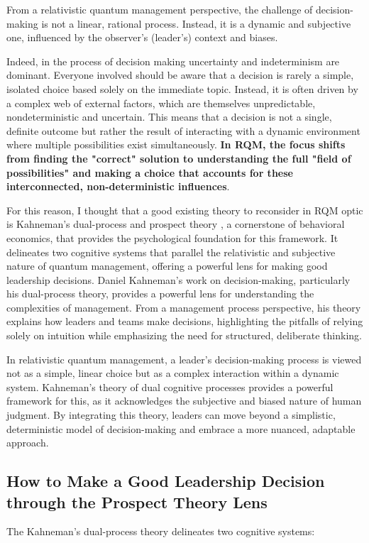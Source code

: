 \documentclass{article}
\begin{document}
From a relativistic quantum management perspective, the challenge of decision-making is not a linear, rational process. Instead, it is a dynamic and subjective one, influenced by the observer's (leader's) context and biases. 

Indeed, in the process of decision making uncertainty and indeterminism are dominant. Everyone involved should be aware that a decision is rarely a simple, isolated choice based solely on the immediate topic. Instead, it is often driven by a complex web of external factors, which are themselves unpredictable, nondeterministic and uncertain. This means that a decision is not a single, definite outcome but rather the result of interacting with a dynamic environment where multiple possibilities exist simultaneously. \textbf{In RQM, the focus shifts from finding the "correct" solution to understanding the full "field of possibilities" and making a choice that accounts for these interconnected, non-deterministic influences}.

For this reason, I thought that a good existing theory to reconsider in RQM optic is Kahneman's dual-process and prospect theory \cite{kahneman2011thinking}, a cornerstone of behavioral economics, that provides the psychological foundation for this framework. It delineates two cognitive systems that parallel the relativistic and subjective nature of quantum management, offering a powerful lens for making good leadership decisions.
Daniel Kahneman's work on decision-making, particularly his dual-process theory, provides a powerful lens for understanding the complexities of management. From a management process perspective, his theory explains how leaders and teams make decisions, highlighting the pitfalls of relying solely on intuition while emphasizing the need for structured, deliberate thinking.

In relativistic quantum management, a leader's decision-making process is viewed not as a simple, linear choice but as a complex interaction within a dynamic system. Kahneman's theory of dual cognitive processes provides a powerful framework for this, as it acknowledges the subjective and biased nature of human judgment. By integrating this theory, leaders can move beyond a simplistic, deterministic model of decision-making and embrace a more nuanced, adaptable approach.
\newpage
\subsection{How to Make a Good Leadership Decision through the Prospect Theory Lens}
\label{dual}
The Kahneman's dual-process theory \cite{kahneman2011thinking} delineates two cognitive systems:
\end{document}
